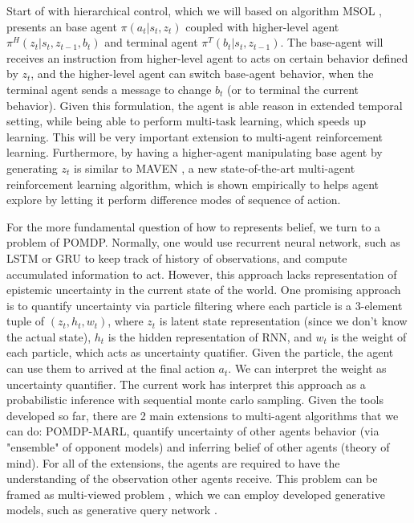 Start of with hierarchical control, which we will based on algorithm MSOL \cite{igl2019multitask}, presents an base agent $\pi(a_t | s_t, z_t)$ coupled with higher-level agent $\pi^H(z_t |s_t, z_{t-1}, b_t)$ and terminal agent $\pi^T(b_t | s_t, z_{t-1})$. The base-agent will receives an instruction from higher-level agent to acts on certain behavior defined by $z_t$, and the higher-level agent can switch base-agent behavior, when the terminal agent sends a message to change $b_t$ (or to terminal the current behavior). Given this formulation, the agent is able reason in extended temporal setting, while being able to perform multi-task learning, which speeds up learning. This will be very important extension to multi-agent reinforcement learning. Furthermore, by having a higher-agent manipulating base agent by generating $z_t$ is similar to MAVEN \cite{mahajan2019maven}, a new state-of-the-art multi-agent reinforcement learning algorithm, which is shown empirically to helps agent explore by letting it perform difference modes of sequence of action. 

For the more fundamental question of how to represents belief, we turn to a problem of POMDP. Normally, one would use recurrent neural network, such as LSTM \cite{hochreiter1997long} or GRU \cite{cho2014properties} to keep track of history of observations, and compute accumulated information to act. However, this approach lacks representation of epistemic uncertainty in the current state of the world. One promising approach is to quantify uncertainty via particle filtering \cite{igl2018deep} where each particle is a 3-element tuple of $(z_t, h_t, w_t)$, where $z_t$ is latent state representation (since we don't know the actual state), $h_t$ is the hidden representation of RNN, and $w_t$ is the weight of each particle, which acts as uncertainty quatifier. Given the particle, the agent can use them to arrived at the final action $a_t$. We can interpret the weight as uncertainty quantifier. The current work \cite{shvechikovjoint}  has interpret this approach as a probabilistic inference with sequential monte carlo sampling. Given the tools developed so far, there are 2 main extensions to multi-agent algorithms that we can do: POMDP-MARL, quantify uncertainty of other agents behavior (via "ensemble" of opponent models) and inferring belief of other agents (theory of mind). For all of the extensions, the agents are required to have the understanding of the observation other agents receive. This problem can be framed as multi-viewed problem \cite{li2019multi}, which we can employ developed generative models, such as generative query network \cite{eslami2018neural}. 

